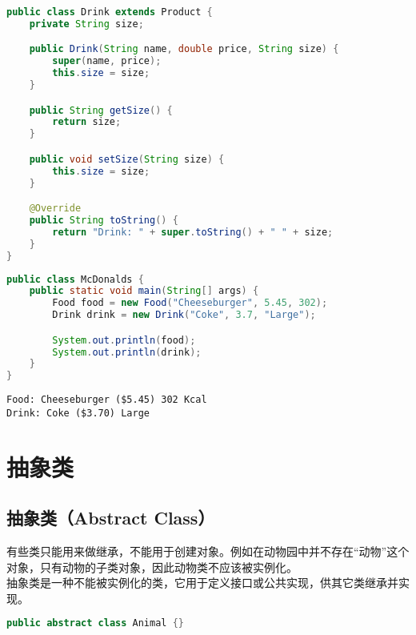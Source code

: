 \begin{lstlisting}[language=Java]
public class Drink extends Product {
    private String size;

    public Drink(String name, double price, String size) {
        super(name, price);
        this.size = size;
    }

    public String getSize() {
        return size;
    }

    public void setSize(String size) {
        this.size = size;
    }

    @Override
    public String toString() {
        return "Drink: " + super.toString() + " " + size;
    }
}
\end{lstlisting}

\begin{lstlisting}[language=Java]
public class McDonalds {
    public static void main(String[] args) {
        Food food = new Food("Cheeseburger", 5.45, 302);
        Drink drink = new Drink("Coke", 3.7, "Large");

        System.out.println(food);
        System.out.println(drink);
    }
}
\end{lstlisting}

\begin{tcolorbox}
    \begin{verbatim}
Food: Cheeseburger ($5.45) 302 Kcal
Drink: Coke ($3.70) Large
	\end{verbatim}
\end{tcolorbox}

\newpage

\section{抽象类}

\subsection{抽象类（Abstract Class）}

有些类只能用来做继承，不能用于创建对象。例如在动物园中并不存在“动物”这个对象，只有动物的子类对象，因此动物类不应该被实例化。\\

抽象类是一种不能被实例化的类，它用于定义接口或公共实现，供其它类继承并实现。

\vspace{-0.5cm}

\begin{lstlisting}[language=Java]
public abstract class Animal {}
\end{lstlisting}


